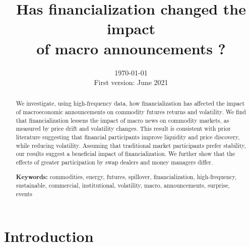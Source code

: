 \documentclass[12pt]{article}
\title{\textbf{Has financialization changed the impact\\ of macro announcements ?}%
}
\date{ \today \\ First version: June 2021}
\begin{document}
\begin{titlepage}
\maketitle





\begin{abstract}
\noindent 
\singlespacing
 We investigate, using high-frequency data, how financialization has affected the impact of macroeconomic announcements on commodity futures returns and volatility. We find that financialization lessens the impact of macro news on commodity markets, as measured by price drift and volatility changes. This result is consistent with prior literature suggesting that financial participants improve liquidity and price discovery, while reducing volatility. Assuming that traditional market participants prefer stability, our results suggest a beneficial impact of financialization. We further show that the effects of greater participation by swap dealers and money managers differ.%

\vspace{0.2in}
\noindent\textbf{Keywords:} commodities, energy, futures,  spillover, financialization, high-frequency, sustainable, commercial, institutional, volatility, macro, announcements, surprise, events\\


\bigskip
\end{abstract}
\setcounter{page}{0}
\thispagestyle{empty}
\end{titlepage}
\pagebreak \newpage




\doublespacing

\section{Introduction} \label{sec:introduction}
\end{document}
